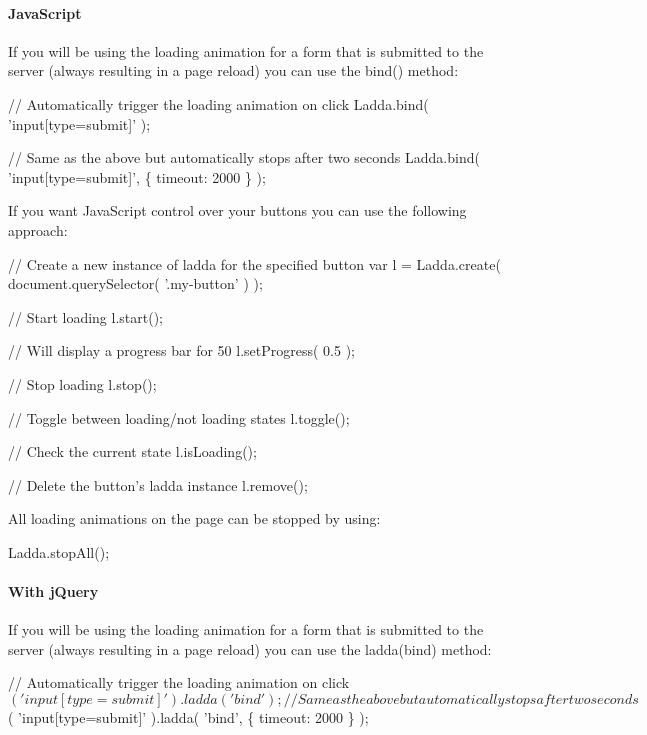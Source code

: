 \paragraph*{Java\+Script}

If you will be using the loading animation for a form that is submitted to the server (always resulting in a page reload) you can use the {\ttfamily bind()} method\+:


\begin{DoxyCode}
// Automatically trigger the loading animation on click
Ladda.bind( 'input[type=submit]' );

// Same as the above but automatically stops after two seconds
Ladda.bind( 'input[type=submit]', \{ timeout: 2000 \} );
\end{DoxyCode}


If you want Java\+Script control over your buttons you can use the following approach\+:


\begin{DoxyCode}
// Create a new instance of ladda for the specified button
var l = Ladda.create( document.querySelector( '.my-button' ) );

// Start loading
l.start();

// Will display a progress bar for 50%
l.setProgress( 0.5 );

// Stop loading
l.stop();

// Toggle between loading/not loading states
l.toggle();

// Check the current state
l.isLoading();

// Delete the button's ladda instance
l.remove();
\end{DoxyCode}


All loading animations on the page can be stopped by using\+:


\begin{DoxyCode}
Ladda.stopAll();
\end{DoxyCode}


\paragraph*{With j\+Query}

If you will be using the loading animation for a form that is submitted to the server (always resulting in a page reload) you can use the {\ttfamily ladda(\textquotesingle{}bind\textquotesingle{})} method\+:


\begin{DoxyCode}
// Automatically trigger the loading animation on click
$( 'input[type=submit]' ).ladda( 'bind' );

// Same as the above but automatically stops after two seconds
$( 'input[type=submit]' ).ladda( 'bind', \{ timeout: 2000 \} );
\end{DoxyCode}


